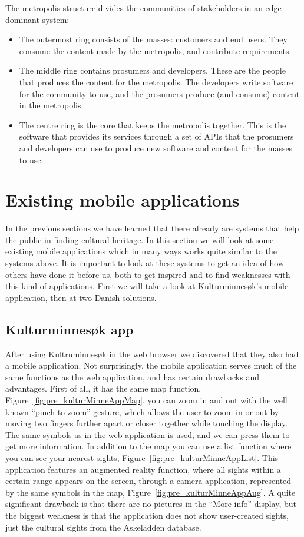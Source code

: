 \documentclass[11pt]{book}
\begin{document}
The metropolis structure divides the communities of stakeholders in an edge dominant system:

\begin{itemize}
  \item The outermost ring consists of the masses: customers and end users. They consume the content made by the metropolis, and contribute requirements.
  \item The middle ring contains prosumers and developers. These are the people that produces the content for the metropolis. The developers write software for the community to use, and the prosumers produce (and consume) content in the metropolis.
  \item The centre ring is the core that keeps the metropolis together. This is the software that provides its services through a set of APIs that the prosumers and developers can use to produce new software and content for the masses to use.
\end{itemize}

\section{Existing mobile applications}\label{sec:prestudy_existing_apps}
In the previous sections we have learned that there already are systems that help the public in finding cultural heritage. In this section we will look at some existing mobile applications which in many ways works quite similar to the systems above. It is important to look at these systems to get an idea of how others have done it before us, both to get inspired and to find weaknesses with this kind of applications. First we will take a look at Kulturminnesøk's mobile application, then at two Danish solutions.

\subsection{Kulturminnesøk app}
After using Kultruminnesøk in the web browser we discovered that they also had a mobile application. Not surprisingly, the mobile application serves much of the same functions as the web application, and has certain drawbacks and  advantages. First of all, it has the same map function, Figure~\ref{fig:pre_kulturMinneAppMap}, you can zoom in and out with the well known ``pinch-to-zoom'' gesture, which allows the user to zoom in or out by moving two fingers further apart or closer together while touching the display. The same symbols as in the web application is used, and we can press them to get more information. In addition to the map you can use a list function where you can see your nearest sights, Figure~\ref{fig:pre_kulturMinneAppList}. This application features an augmented reality function, where all sights within a certain range appears on the screen, through a camera application, represented by the same symbols in the map, Figure~\ref{fig:pre_kulturMinneAppAug}.  A quite significant drawback is that there are no pictures in the ``More info'' display, but the biggest weakness is that the application does not show user-created sights, just the cultural sights from the Askeladden database.
\end{document}
